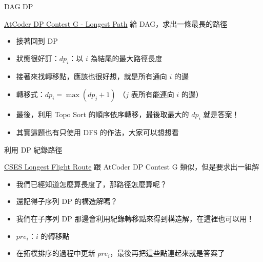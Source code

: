 \documentclass[aspectratio=169]{beamer}
\begin{document}
    \begin{frame}{DAG DP}
        \begin{block}{\href{https://atcoder.jp/contests/dp/tasks/dp_g}{AtCoder DP Contest G - Longest Path}}
            給 DAG，求出一條最長的路徑
        \end{block}

        \begin{itemize}
            \item<1-> 接著回到 DP
            \item<2-> 狀態很好訂：$dp_i$：以 $i$ 為結尾的最大路徑長度
            \item<3-> 接著來找轉移點，應該也很好想，就是所有通向 $i$ 的邊
            \item<4-> 轉移式：$dp_i = \max(dp_j + 1)$ （$j$ 表所有能連向 $i$ 的邊） 
            \item<5-> 最後，利用 Topo Sort 的順序依序轉移，最後取最大的 $dp_i$ 就是答案！
            \item<6-> 其實這題也有只使用 DFS 的作法，大家可以想想看
        \end{itemize}
    \end{frame}

    \begin{frame}{利用 DP 紀錄路徑}
        \begin{block}{\href{https://cses.fi/problemset/task/1680/}{CSES Longest Flight Route}}
            跟 AtCoder DP Contest G 類似，但是要求出一組解
        \end{block}

        \begin{itemize}
            \item<1-> 我們已經知道怎麼算長度了，那路徑怎麼算呢？
            \item<2-> 還記得子序列 DP 的構造解嗎？
            \item<2-> 我們在子序列 DP 那邊會利用紀錄轉移點來得到構造解，在這裡也可以用！
            \item<3-> $pre_i$：$i$ 的轉移點
            \item<4-> 在拓樸排序的過程中更新 $pre_i$，最後再把這些點連起來就是答案了
        \end{itemize}
    \end{frame}
    
\end{document}
